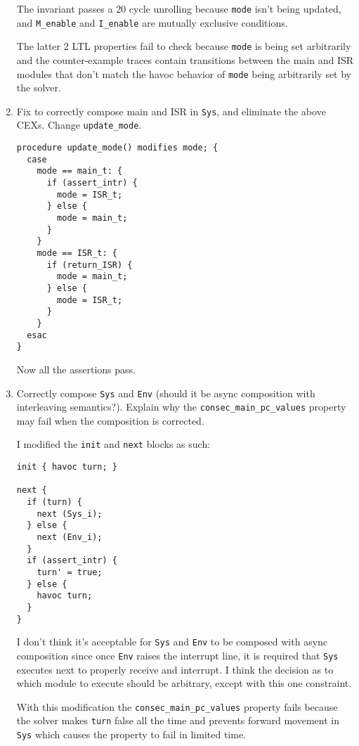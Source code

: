 \begin{enumerate}[label=(\alph*)]
    The invariant passes a 20 cycle unrolling because \verb|mode| isn't being updated, and \verb|M_enable| and \verb|I_enable| are mutually exclusive conditions.

    The latter 2 LTL properties fail to check because \verb|mode| is being set arbitrarily and the counter-example traces contain transitions between the main and ISR modules that don't match the havoc behavior of \verb|mode| being arbitrarily set by the solver.

  \item {\color{blue}Fix to correctly compose main and ISR in \verb|Sys|, and eliminate the above CEXs. Change \verb|update_mode|.}

    \begin{verbatim}
procedure update_mode() modifies mode; {
  case
    mode == main_t: {
      if (assert_intr) {
        mode = ISR_t;
      } else {
        mode = main_t;
      }
    }
    mode == ISR_t: {
      if (return_ISR) {
        mode = main_t;
      } else {
        mode = ISR_t;
      }
    }
  esac
}
    \end{verbatim}

    Now all the assertions pass.

  \item {\color{blue} Correctly compose \verb|Sys| and \verb|Env| (should it be async composition with interleaving semantics?). Explain why the \verb|consec_main_pc_values| property may fail when the composition is corrected.}

    I modified the \verb|init| and \verb|next| blocks as such:

    \begin{verbatim}
init { havoc turn; }

next {
  if (turn) {
    next (Sys_i);
  } else {
    next (Env_i);
  }
  if (assert_intr) {
    turn' = true;
  } else {
    havoc turn;
  }
}
    \end{verbatim}

    I don't think it's acceptable for \verb|Sys| and \verb|Env| to be composed with async composition since once \verb|Env| raises the interrupt line, it is required that \verb|Sys| executes next to properly receive and interrupt. I think the decision as to which module to execute should be arbitrary, except with this one constraint.

    With this modification the \verb|consec_main_pc_values| property fails because the solver makes \verb|turn| false all the time and prevents forward movement in \verb|Sys| which causes the property to fail in limited time.
\end{enumerate}

